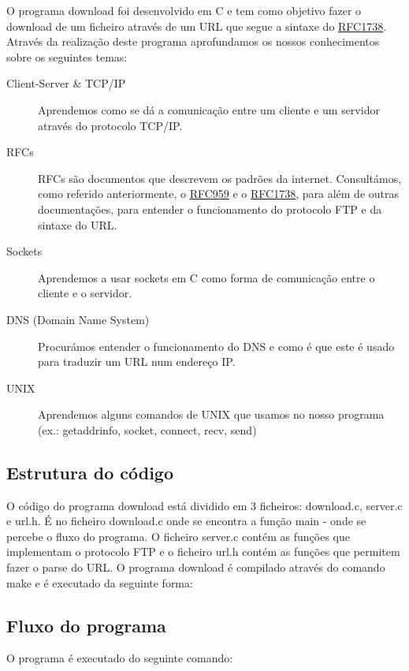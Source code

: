 \documentclass[11pt,a4paper,twocolumn]{report}
\newcommand{\hl}[1]{\textcolor{text-hl}{#1}}
\begin{document}
O programa \hl{download} foi desenvolvido em \hl{C} e tem como objetivo fazer o download de um ficheiro através de um \hl{URL} que segue a sintaxe do \href{https://datatracker.ietf.org/doc/html/rfc1738}{RFC1738}.
Através da realização deste programa aprofundamos os nossos conhecimentos sobre os seguintes temas:
\begin{description}
    \item[Client-Server \& TCP/IP] Aprendemos como se dá a comunicação entre um cliente e um servidor através do protocolo \hl{TCP/IP}.
    \item[RFCs] RFCs são documentos que descrevem os padrões da internet. Consultámos, como referido anteriormente, o \href{https://datatracker.ietf.org/doc/html/rfc959}{RFC959} e o \href{https://datatracker.ietf.org/doc/html/rfc1738}{RFC1738}, para além de outras documentações, para entender o funcionamento do protocolo \hl{FTP} e da sintaxe do \hl{URL}.
    \item[Sockets] Aprendemos a usar \hl{sockets} em \hl{C} como forma de comunicação entre o cliente e o servidor.
    \item[DNS (Domain Name System)] Procurámos entender o funcionamento do \hl{DNS} e como é que este é usado para traduzir um \hl{URL} num endereço \hl{IP}.
    \item[UNIX] Aprendemos alguns comandos de \hl{UNIX} que usamos no nosso programa (ex.: \hl{getaddrinfo}, \hl{socket}, \hl{connect}, \hl{recv}, \hl{send})
\end{description}

\subsection{Estrutura do código}

O código do programa \hl{download} está dividido em 3 ficheiros: \hl{download.c}, \hl{server.c} e \hl{url.h}.
É no ficheiro \hl{download.c} onde se encontra a função \hl{main} - onde se percebe o fluxo do programa. O ficheiro \hl{server.c} contém as funções que implementam o protocolo \hl{FTP} e o ficheiro \hl{url.h} contém as funções que permitem fazer o \hl{parse} do \hl{URL}.
O programa \hl{download} é compilado através do comando \hl{make} e é executado da seguinte forma:

\subsection{Fluxo do programa}

O programa é executado do seguinte comando:
\end{document}
